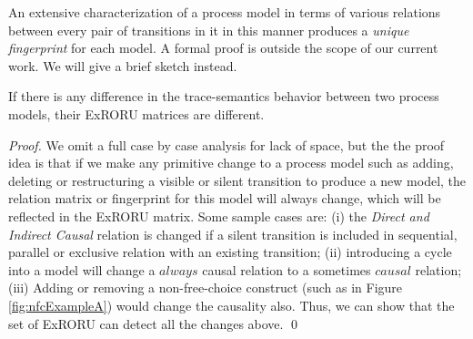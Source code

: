 \documentclass{llncs}
\begin{document}

An extensive characterization of a process model in terms of various relations between every pair of transitions in it in this manner produces a \textit{unique fingerprint} for each model. A formal proof is outside the scope of our current work. We will give a brief sketch instead. %

\begin{theorem}[Uniqueness]\label{the:uniqueness}
If there is any difference in the trace-semantics behavior between two process models, their ExRORU matrices are different.
\end{theorem}
\begin{proof}
We omit a full case by case analysis for lack of space, but the the proof idea is that if we make any primitive change to a process model such as adding, deleting or restructuring a visible or silent transition to produce a new model, the relation matrix or fingerprint for this model will always change, which will be reflected in the ExRORU matrix.  Some sample cases are: (i) the \textit{Direct and Indirect Causal} relation is changed if a silent transition is included in sequential, parallel or exclusive relation with an existing transition; (ii) introducing a cycle into a model will change a $always$ causal relation to a sometimes $causal$ relation; (iii) Adding or removing a non-free-choice construct (such as in Figure \ref{fig:nfcExampleA}) would change the causality also. Thus, we can show that the set of ExRORU can detect all the changes above. \qed
\end{proof}
\end{document}
